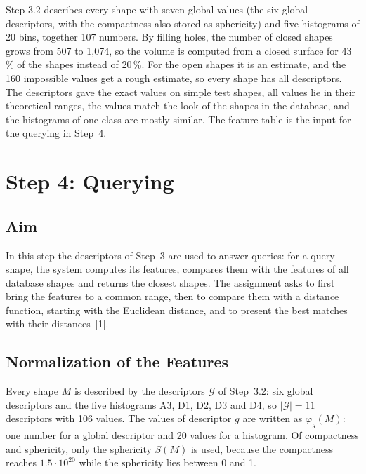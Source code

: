 \documentclass[10pt,a4paper]{article}
\newcommand{\card}[1]{\lvert #1\rvert}
\begin{document}
Step 3.2 describes every shape with seven global values (the six global descriptors, with the compactness also stored as
sphericity) and five histograms of 20 bins, together 107 numbers. By filling holes, the number of closed shapes grows from 507 to
1,074, so the volume is computed from a closed surface for 43\,\% of the shapes instead of 20\,\%. For the open shapes it is an estimate, and the 160
impossible values get a rough estimate, so every shape has all descriptors. The descriptors gave the exact values on simple test shapes, all values lie in their
theoretical ranges, the values match the look of the shapes in the database, and the histograms of one class are mostly similar. The feature table is the input for the querying in Step~4.

\section{Step 4: Querying}\label{sec:step4}

\subsection{Aim}
In this step the descriptors of Step~3 are used to answer queries: for a query shape, the system computes its features, compares
them with the features of all database shapes and returns the closest shapes. The assignment asks to first bring the features to
a common range, then to compare them with a distance function, starting with the Euclidean distance, and to present the best
matches with their distances~[1].

\subsection{Normalization of the Features}\label{sec:s4norm}
Every shape $M$ is described by the descriptors $\mathcal{G}$ of Step~3.2: six global descriptors and the five histograms A3,
D1, D2, D3 and D4, so $\card{\mathcal{G}}=11$ descriptors with 106 values. The values of descriptor $g$ are written as
$\varphi_g(M)$: one number for a global descriptor and 20 values for a histogram. Of compactness and sphericity, only the
sphericity $S(M)$ is used, because the compactness reaches $1.5\cdot10^{20}$ while the sphericity lies between 0 and 1.
\end{document}
